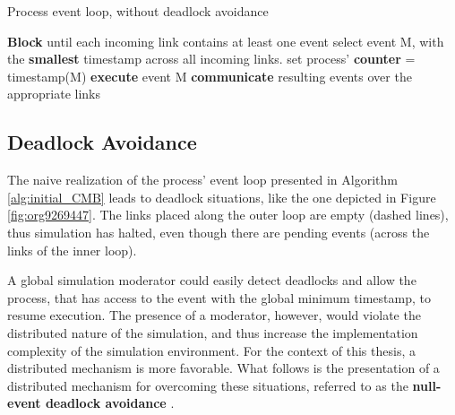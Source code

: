 \documentclass[11pt]{article}
\begin{document}
\begin{LATEX}
\begin{algorithm}
\caption{Process event loop, without deadlock avoidance}
\label{alg:initial_CMB}
\begin{algorithmic}[1]

      \State \textbf{Block} until each incoming link contains at least one event
      \State select event M, with the \textbf{smallest} timestamp across all incoming links.
      \State set process' \textbf{counter} = timestamp(M)
      \State \textbf{execute} event M
      \State \textbf{communicate} resulting events over the appropriate links
   \EndWhile

\end{algorithmic}
\end{algorithm}
\end{LATEX}

\subsection{Deadlock Avoidance}
\label{sec:org3bb5bd9}
The naive realization of the process' event loop presented in Algorithm \ref{alg:initial_CMB} leads to deadlock situations, like the one depicted in Figure \ref{fig:org9269447}.
The links placed along the outer loop are empty (dashed lines), thus simulation has halted, even though there are pending events (across the links of the inner loop).

A global simulation moderator could easily detect deadlocks and allow the process, that has access to the event with the global minimum timestamp, to resume execution.
The presence of a moderator, however, would violate the distributed nature of the simulation, and thus increase the implementation complexity of the simulation environment.
For the context of this thesis, a distributed mechanism is more favorable.
What follows is the presentation of a distributed mechanism for overcoming these situations, referred to as the \textbf{null-event deadlock avoidance} \cite{Fujimoto1999}.
\end{document}
